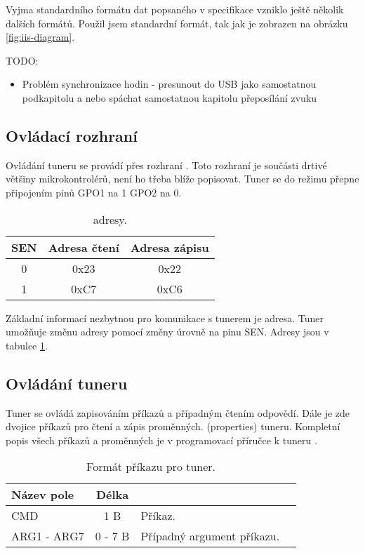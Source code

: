 Vyjma standardního formátu dat popsaného v \iis specifikace \cite{iis} vzniklo ještě několik dalších formátů. Použil jsem standardní formát, tak jak je zobrazen na obrázku \ref{fig:iis-diagram}.

TODO:
\begin{itemize}
\item Problém synchronizace hodin - presunout do USB jako samostatnou podkapitolu a nebo spáchat samostatnou kapitolu přeposílání zvuku
\end{itemize}


\subsection{Ovládací rozhraní \iic}
Ovládání tuneru se provádí přes rozhraní \iic. Toto rozhraní je součásti drtivé většiny mikrokontrolérů, není ho třeba blíže popisovat. Tuner se do režimu \iic přepne připojením pinů GPO1 na 1 GPO2 na 0.

\begin{table}[ht!]
\begin{center}
\begin{tabular}{|c|c|c|}
\hline 
SEN & Adresa čtení & Adresa zápisu  \\ 
\hline 
0 & 0x23 & 0x22 \\ 
\hline 
1 & 0xC7 & 0xC6 \\ 
\hline 
\end{tabular}
\end{center}
\caption{\iic adresy.}
\label{tab:iic_addresses} 
\end{table}

Základní informací nezbytnou pro komunikace s tunerem je \iic adresa. Tuner umožňuje změnu adresy pomocí změny úrovně na pinu SEN. Adresy jsou v tabulce \ref{tab:iic_addresses}.

\subsection{Ovládání tuneru}
\label{subsec:tuner-control}
Tuner se ovládá zapisováním příkazů a případným čtením odpovědí. Dále je zde dvojice příkazů pro čtení a zápis proměnných. (properties) tuneru. Kompletní popis všech příkazů a proměnných je v programovací příručce k tuneru \cite{tuner-programing}.

\begin{table}[ht!]
\begin{center}
\begin{tabular}{|l|c|l|l|}
\hline 
Název pole & Délka &  \\ 
\hline
CMD & 1 B & Příkaz.\\
\hline
ARG1 - ARG7 & 0 - 7 B & Případný argument příkazu.\\
\hline
\end{tabular} 
\end{center}
\caption{Formát příkazu pro tuner.}
\label{tab:tuner-cmd} 
\end{table}

